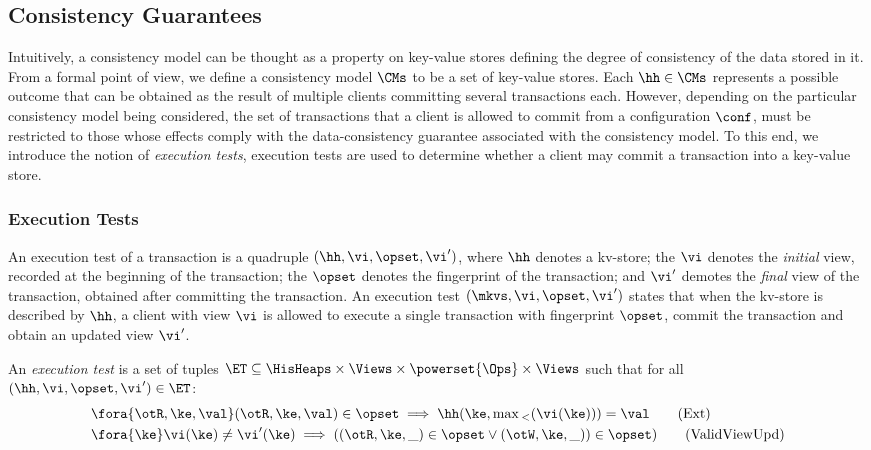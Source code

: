 \subsection{Consistency Guarantees}


Intuitively, a consistency model can be thought as a property on key-value stores 
defining the degree of consistency of the data stored in it.
From a formal point of view, we define a consistency model 
$\CMs$ to be a set of key-value stores.  
Each $\hh \in \CMs$ represents a possible outcome that 
can be obtained as the result of multiple clients committing several transactions each. 
However, depending on the particular consistency model being considered, the set of transactions that a client is allowed to commit  
from a configuration $\conf$, must be restricted to those whose effects comply with the data-consistency guarantee associated with 
the consistency model. 
To this end, we introduce the notion of \emph{execution tests}, 
execution tests are used to determine whether a client may commit a transaction into a key-value store.

\subsubsection{Execution Tests}
An execution test of a transaction is a quadruple $(\hh, \vi, \opset, \vi')$, where $\hh$ denotes a kv-store;
the $\vi$ denotes the \emph{initial} view, recorded at the beginning of the transaction; 
the $\opset$ denotes the fingerprint of the transaction; and 
$\vi'$ demotes the \emph{final} view of the transaction, obtained after committing the transaction. 
An execution test $(\mkvs, \vi, \opset, \vi')$ states that when the kv-store is described by $\hh$, a client with view $\vi$ is allowed to execute a single transaction with fingerprint $\opset$, commit the transaction and obtain an updated view $\vi'$. 

\begin{definition}
\label{def:execution.test}
An \emph{execution test} is a set of tuples $\ET \subseteq \HisHeaps \times \Views \times \powerset{\Ops} \times \Views$ 
such that for all $(\hh, \vi, \opset, \vi') \in \ET$:
\begin{align}
    & \fora{\otR, \ke, \val} (\otR, \ke, \val) \in \opset \implies \hh(\ke, \max{}_{<}(\vi(\ke))) = \val \tag{Ext} \label{eq:read-external} \\
    & \fora{\ke} \vi(\ke) \neq \vi'(\ke) \implies
    ( (\otR, \ke, \_) \in \opset \vee (\otW, \ke, \_)) \in \opset) \tag{ValidViewUpd} \label{eq:valid-view-update}
\end{align}
\end{definition}


